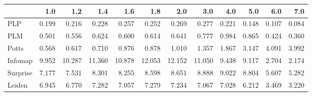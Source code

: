 \begin{tabular}{lrrrrrrrrrrr}
\toprule
{} &   1.0 &    1.2 &    1.4 &    1.6 &    1.8 &    2.0 &    3.0 &   4.0 &   5.0 &   6.0 &   7.0 \\
\midrule
PLP      & 0.199 &  0.216 &  0.228 &  0.257 &  0.252 &  0.269 &  0.277 & 0.221 & 0.148 & 0.107 & 0.084 \\
PLM      & 0.501 &  0.556 &  0.624 &  0.600 &  0.614 &  0.641 &  0.777 & 0.984 & 0.865 & 0.424 & 0.360 \\
Potts    & 0.568 &  0.617 &  0.710 &  0.876 &  0.878 &  1.010 &  1.357 & 1.867 & 3.147 & 4.091 & 3.992 \\
Infomap  & 9.952 & 10.287 & 11.360 & 10.878 & 12.053 & 12.152 & 11.050 & 9.438 & 9.117 & 2.704 & 2.174 \\
Surprise & 7.177 &  7.531 &  8.301 &  8.255 &  8.598 &  8.651 &  8.888 & 9.022 & 8.804 & 5.607 & 5.282 \\
Leiden   & 6.945 &  6.770 &  7.282 &  7.057 &  7.279 &  7.234 &  7.067 & 7.028 & 6.212 & 3.469 & 3.220 \\
\bottomrule
\end{tabular}
